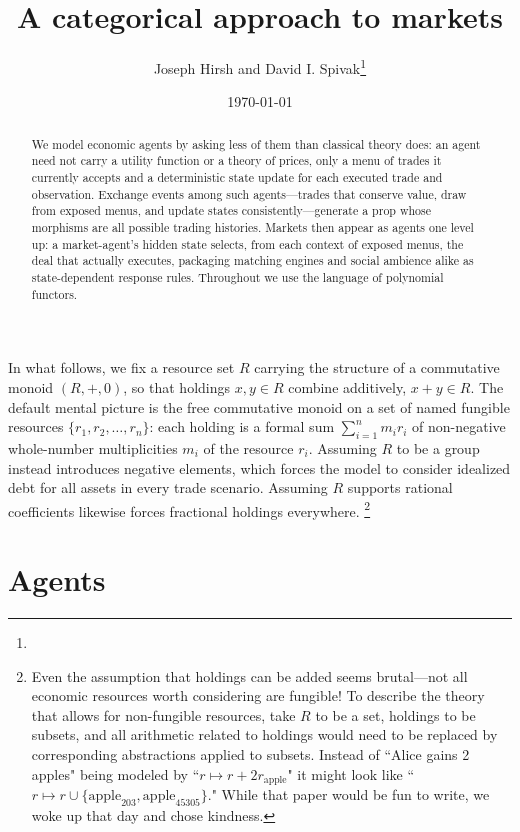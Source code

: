 \documentclass[11pt, one side, article]{memoir}
\title{A categorical approach to markets}
\author{Joseph Hirsh and David I. Spivak\thanks{\thanksAFOSR{FA9550-23-1-0376}}}
\date{\today}
\theoremstyle{definition}
\theoremstyle{plain}
\newcommand{\0}{\textsf{0}}
\newcommand{\1}{\tn{\textsf{1}}}
\begin{document}
\maketitle
\begin{abstract}
\noindent We model economic agents by asking less of them than
classical theory does: an agent need not carry a utility function or
a theory of prices, only a menu of trades it currently accepts and a
deterministic state update for each executed trade and observation.
Exchange events among such agents---trades that conserve value,
draw from exposed menus, and update states consistently---generate a
prop whose morphisms are all possible trading histories.  Markets
then appear as agents one level up: a market-agent's hidden state
selects, from each context of exposed menus, the deal that actually
executes, packaging matching engines and social ambience alike as
state-dependent response rules.  Throughout
we use the language of polynomial functors.
\end{abstract}

In what follows, we fix a resource set $R$ carrying the structure of a commutative monoid $(R,+,0)$, so that holdings $x, y \in R$ combine additively, $x+y \in R$.  The default mental picture is the free commutative monoid on a set of named fungible resources $\{ r_1, r_2, \ldots, r_n \}$: each holding is a formal sum $\sum_{i=1}^n m_i r_i$ of non-negative whole-number multiplicities $m_i$ of the resource $r_i$.  Assuming $R$ to be a group instead introduces negative elements, which forces the model to consider idealized debt for all assets in every trade scenario. Assuming $R$ supports rational coefficients likewise forces fractional holdings everywhere.%
\footnote{Even the assumption that holdings can be added seems brutal---not all economic resources worth considering are fungible! To describe the theory that allows for non-fungible resources, take $R$ to be a set, holdings to be subsets, and all arithmetic related to holdings would need to be replaced by corresponding abstractions applied to subsets. Instead of ``Alice gains 2 apples" being modeled by ``$r \mapsto r + 2r_{\textrm{apple}}$" it might look like ``$r \mapsto r \cup \{ \textrm{apple}_{203}, \textrm{apple}_{45305} \}$." While that paper would be fun to write, we woke up that day and chose kindness.}

\section*{Agents}
\end{document}
